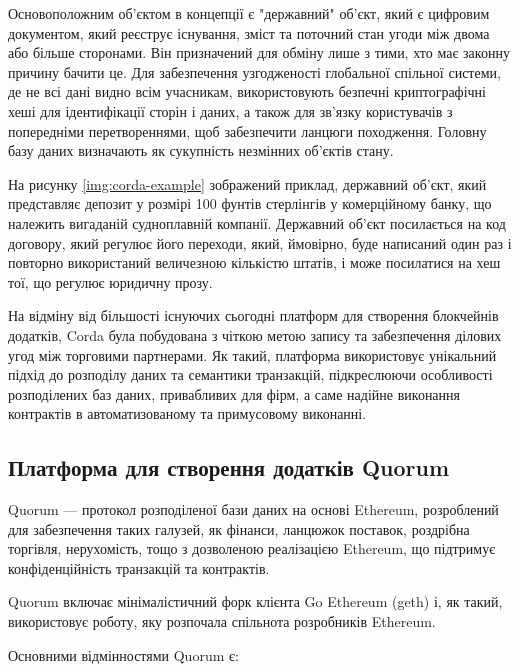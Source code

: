 \documentclass{lib/styles/default-style}
\begin{document}
    Основоположним об'єктом в концепції є "державний" об'єкт, який є цифровим документом,
    який реєструє існування, зміст та поточний стан угоди між двома або більше сторонами.
    Він призначений для обміну лише з тими, хто має законну причину бачити це.
    Для забезпечення узгодженості глобальної спільної системи, де не всі дані видно всім учасникам,
    використовують безпечні криптографічні хеші для ідентифікації сторін і даних, а також для зв’язку користувачів
    з попередніми перетвореннями,
    щоб забезпечити ланцюги походження. Головну базу даних визначають як сукупність незмінних об'єктів стану.

    На рисунку \ref{img:corda-example} зображений приклад, державний об'єкт,
    який представляє депозит у розмірі 100 фунтів стерлінгів у комерційному банку,
    що належить вигаданій судноплавній компанії.
    Державний об'єкт посилається на код договору,
    який регулює його переходи, який, ймовірно,
    буде написаний один раз і повторно використаний величезною кількістю штатів, і може посилатися на хеш тої, що регулює юридичну прозу.


    На відміну від більшості існуючих сьогодні платформ для створення блокчейнів додатків, Corda була побудована з чіткою метою
    запису та забезпечення ділових угод між торговими партнерами.
    Як такий, платформа використовує унікальний підхід до розподілу даних та семантики транзакцій,
    підкреслюючи особливості розподілених баз даних, привабливих для фірм, а саме надійне виконання контрактів в автоматизованому
    та примусовому виконанні.

\subsection{Платформа для створення додатків Quorum}

    Quorum --- протокол розподіленої бази даних на основі Ethereum, розроблений для забезпечення таких галузей,
    як фінанси, ланцюжок поставок, роздрібна торгівля, нерухомість, тощо з дозволеною реалізацією Ethereum,
    що підтримує конфіденційність транзакцій та контрактів.

    Quorum включає мінімалістичний форк клієнта Go Ethereum (geth) і,
    як такий, використовує роботу, яку розпочала спільнота розробників Ethereum.

    Основними відмінностями Quorum є:
\end{document}
